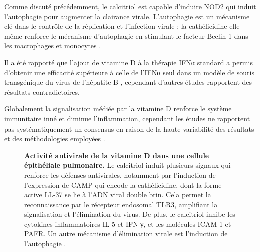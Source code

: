 \documentclass[
  a4paper,
  DIV=11,
  numbers=noendperiod,
  listof=totoc]{scrreprt}
\begin{document}
Comme discuté précédemment, le calcitriol est capable d'induire NOD2 qui
induit l'autophagie pour augmenter la clairance virale. L'autophagie est
un mécanisme clé dans le contrôle de la réplication et l'infection
virale ; la cathélicidine elle-même renforce le mécanisme d'autophagie
en stimulant le facteur Beclin-1 dans les macrophages et monocytes
\autocite{Bishop.2021}.

Il a été rapporté que l'ajout de vitamine D à la thérapie IFNα standard
a permis d'obtenir une efficacité supérieure à celle de l'IFNα seul dans
un modèle de souris transgénique du virus de l'hépatite B
\autocite{Lee.2020}, cependant d'autres études rapportent des résultats
contradictoires.

Globalement la signalisation médiée par la vitamine D renforce le
système immunitaire inné et diminue l'inflammation, cependant les études
ne rapportent pas systématiquement un consensus en raison de la haute
variabilité des résultats et des méthodologies employées
\autocite{Lee.2020}.

\begin{figure}


\caption[Activité antivirale de la vitamine D dans une cellule
épithéliale pulmonaire.]{\label{fig-vd-antiviral}\textbf{Activité
antivirale de la vitamine D dans une cellule épithéliale pulmonaire.} Le
calcitriol induit plusieurs signaux qui renforce les défenses
antivirales, notamment par l'induction de l'expression de CAMP qui
encode la cathélicidine, dont la forme active LL-37 se lie à l'ADN viral
double brin. Cela permet la reconnaissance par le récepteur endosomal
TLR3, amplifiant la signalisation et l'élimination du virus. De plus, le
calcitriol inhibe les cytokines inflammatoires IL-5 et IFN-γ, et les
molécules ICAM-1 et PAFR. Un autre mécanisme d'élimination virale est
l'induction de l'autophagie \autocite{Ismailova.2022}.}

\end{figure}%
\end{document}
